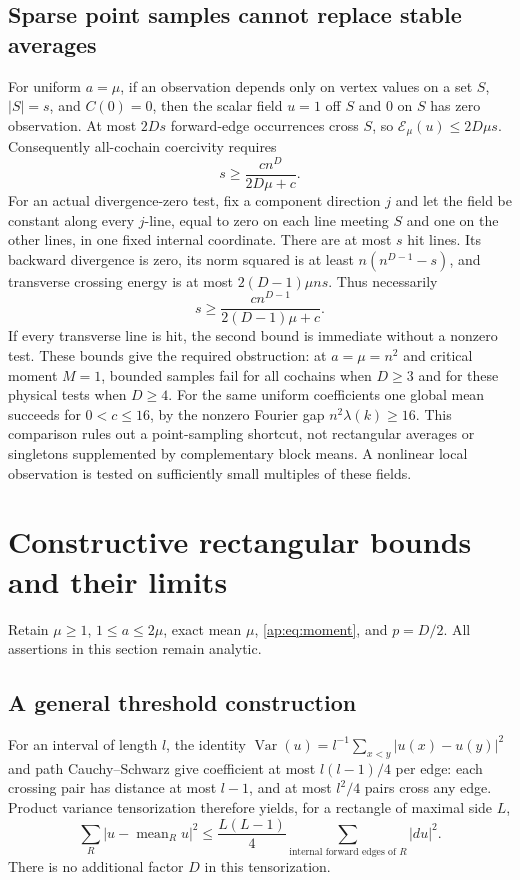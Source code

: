 \documentclass[11pt]{article}
\newcommand{\E}{\mathcal E}
\begin{document}
\subsection{Sparse point samples cannot replace stable averages}
For uniform $a=\mu$, if an observation depends only on vertex values on a set $S$, $|S|=s$, and
$C(0)=0$, then the scalar field $u=1$ off $S$ and $0$ on $S$ has zero observation.
At most $2Ds$ forward-edge occurrences cross $S$, so
$\E_\mu(u)\leq2D\mu s$. Consequently all-cochain coercivity requires
\[
 s\geq\frac{cn^D}{2D\mu+c}.
\]
For an actual divergence-zero test, fix a component direction $j$ and let the field
be constant along every $j$-line, equal to zero on each line meeting $S$ and one on
the other lines, in one fixed internal coordinate. There are at most $s$ hit lines.
Its backward divergence is zero, its norm squared is at least
$n(n^{D-1}-s)$, and transverse crossing energy is at most $2(D-1)\mu ns$.
Thus necessarily
\[
 s\geq\frac{cn^{D-1}}{2(D-1)\mu+c}.
\]
If every transverse line is hit, the second bound is immediate without a nonzero test. These bounds give the required obstruction:
at $a=\mu=n^2$ and critical moment $M=1$, bounded samples fail for all cochains
when $D\geq3$ and for these physical tests when $D\geq4$.
For the same uniform coefficients one global mean succeeds for $0<c\leq16$,
by the nonzero Fourier gap $n^2\lambda(k)\geq16$.
This comparison rules out a point-sampling shortcut, not rectangular averages or
singletons supplemented by complementary block means. A nonlinear local observation
is tested on sufficiently small multiples of these fields.

\section{Constructive rectangular bounds and their limits}\label{ap:sec:spatial-new}
Retain $\mu\geq1$, $1\leq a\leq2\mu$, exact mean $\mu$, \eqref{ap:eq:moment},
and $p=D/2$. All assertions in this section remain analytic.

\subsection{A general threshold construction}
For an interval of length $l$, the identity
$\operatorname{Var}(u)=l^{-1}\sum_{x<y}|u(x)-u(y)|^2$ and path
Cauchy--Schwarz give coefficient at most $l(l-1)/4$ per edge: each
crossing pair has distance at most $l-1$, and at most $l^2/4$ pairs cross
any edge. Product variance tensorization therefore yields, for a rectangle
of maximal side $L$,
\begin{equation}\label{ap:eq:boxvar}
 \sum_R|u-\operatorname{mean}_R u|^2
 \leq \frac{L(L-1)}4\sum_{\text{internal forward edges of }R}|du|^2.
\end{equation}
There is no additional factor $D$ in this tensorization.
\end{document}
